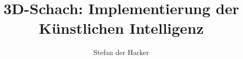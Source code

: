 \documentclass{../3dchess}
\title{3D-Schach: Implementierung der Künstlichen Intelligenz}
\author{Stefan der Hacker}
\begin{document}
  \maketitle  
  
  \tableofcontents
    
  
  
  
  
    
  \appendix
  
  
  \nocite{*}
\end{document}
